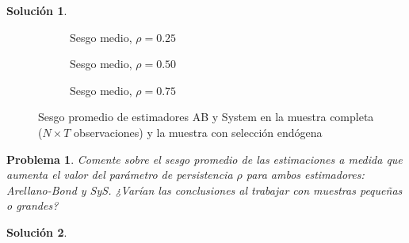 \documentclass[12pt,letterpaper,reqno,oneside]{amsart}
\theoremstyle{problemstyle} %
\newtheorem{problem}{Problema}
\theoremstyle{definition} %
\newtheorem{solution}{Solución}[problem]
\renewcommand{\thesolution}{\theproblem~(\alph{solution})}
\begin{document}
\begin{solution} %
  \label{sol:2}

  \begin{figure}[htbp]
    \centering
    \begin{subfigure}[b]{0.49\textwidth}
      \centering
      \resizebox{\textwidth}{!}{}
      \caption{Sesgo medio, $\rho = 0.25$}
      \label{fig:panel1}
    \end{subfigure}
    \hfill
    \begin{subfigure}[b]{0.49\textwidth}
      \centering
      \resizebox{\textwidth}{!}{}
      \caption{Sesgo medio, $\rho = 0.50$}
      \label{fig:panel2}
    \end{subfigure}

    \vfill

    \begin{subfigure}[b]{0.5\textwidth}
      \centering
      \resizebox{\textwidth}{!}{}
      \caption{Sesgo medio, $\rho = 0.75$}
      \label{fig:panel3}
    \end{subfigure}

    \caption{Sesgo promedio de estimadores AB y System en la muestra completa ($N\times T$ observaciones) y la muestra con selección endógena}
    \label{fig:fig1}
  \end{figure}

\end{solution}
\endgroup
\begin{mdframed}
  \begin{problem}
  \label{prob:3}
  Comente sobre el sesgo promedio de las estimaciones a medida que aumenta el valor del parámetro de persistencia $\rho$ para ambos estimadores: Arellano-Bond y SyS. ¿Varían las conclusiones al trabajar con muestras pequeñas o grandes?
  \end{problem}
\end{mdframed}
\begingroup
\renewcommand{\thesolution}{\theproblem}
\begin{solution} %
  \label{sol:3}

\end{solution}
\endgroup
\printbibliography
\end{document}
